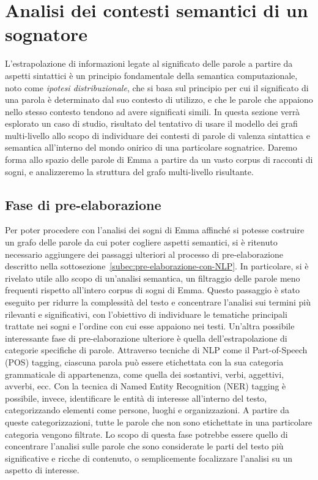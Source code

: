 \section{Analisi dei contesti semantici di un sognatore}\label{sec:analisi-dei-contesti-semantici-di-un-sognatore}

L'estrapolazione di informazioni legate al significato delle parole a partire da aspetti sintattici \`e un
principio fondamentale della semantica computazionale, noto come \textit{ipotesi distribuzionale}, che si basa sul
principio per cui il significato di una parola \`e determinato dal suo contesto di utilizzo, e che le parole che
appaiono nello stesso contesto tendono ad avere significati simili.\newline
In questa sezione verrà esplorato un caso di studio, risultato del tentativo di usare il modello dei grafi multi-livello
allo scopo di individuare dei contesti di parole di valenza sintattica e semantica all'interno del mondo onirico
di una particolare sognatrice.
Daremo forma allo spazio delle parole di Emma a partire da un vasto corpus di racconti di sogni, e analizzeremo la
struttura del grafo multi-livello risultante.

\subsection{Fase di pre-elaborazione}

Per poter procedere con l'analisi dei sogni di Emma affinché si potesse costruire un grafo delle parole
da cui poter cogliere aspetti semantici, si è ritenuto necessario aggiungere dei passaggi ulteriori
al processo di pre-elaborazione descritto nella sottosezione~\ref{subec:pre-elaborazione-con-NLP}.
In particolare, si è rivelato utile allo scopo di un'analisi semantica,
un filtraggio delle parole meno frequenti rispetto all'intero corpus di sogni di Emma.
Questo passaggio è stato eseguito per ridurre la complessità del testo e concentrare l'analisi sui
termini più rilevanti e significativi, con l'obiettivo di individuare le tematiche principali trattate
nei sogni e l'ordine con cui esse appaiono nei testi.
Un'altra possibile interessante fase di pre-elaborazione ulteriore è quella dell'estrapolazione di categorie
specifiche di parole.
Attraverso tecniche di NLP come il Part-of-Speech (POS) tagging, ciascuna parola può essere etichettata con la sua
categoria grammaticale di appartenenza, come quella dei sostantivi, verbi, aggettivi, avverbi, ecc.
Con la tecnica di Named Entity Recognition (NER) tagging è possibile, invece, identificare le entità di interesse
all'interno del testo, categorizzando elementi come persone, luoghi e organizzazioni.
A partire da queste categorizzazioni, tutte le parole che non sono etichettate in una particolare
categoria vengono filtrate. Lo scopo di questa fase potrebbe essere quello di concentrare l'analisi sulle parole che
sono considerate le parti del testo più significative e ricche di contenuto, o semplicemente focalizzare l'analisi
su un aspetto di interesse.



